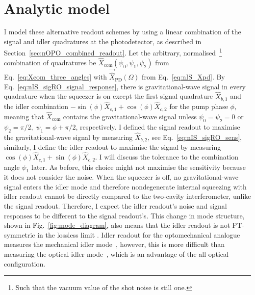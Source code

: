 \section{Analytic model}
\label{sec:nIS_idlerRO_model}

I model these alternative readout schemes by using a linear combination of the signal and idler quadratures at the photodetector, as described in Section~\ref{sec:nOPO_combined_readout}. Let the arbitrary, normalised~\footnote{Such that the vacuum value of the shot noise is still one.} combination of quadratures be $\hat{X}_\text{com}(\psi_0,\psi_1,\psi_2)$ from Eq.~\ref{eq:Xcom_three_angles} with $\vec{\hat X}_\text{PD}(\Omega)$ from Eq.~\ref{eq:nIS_Xpd}. By Eq.~\ref{eq:nIS_sigRO_signal_response}, there is gravitational-wave signal in every quadrature when the squeezer is on except the first signal quadrature $\hat{X}_{b,1}$ and the idler combination $-\sin(\phi)\hat{X}_{c,1}+\cos(\phi)\hat{X}_{c,2}$ for the pump phase $\phi$, meaning that $\hat{X}_\text{com}$ contains the gravitational-wave signal unless $\psi_0=\psi_2=0$ or $\psi_2=\pi/2,\;\psi_1=\phi+\pi/2$, respectively. I defined the signal readout to maximise the gravitational-wave signal by measuring $\hat{X}_{b,2}$, see Eq.~\ref{eq:nIS_sigRO_sens}, similarly, I define the idler readout to maximise the signal by measuring $\cos(\phi)\hat{X}_{c,1}+\sin(\phi)\hat{X}_{c,2}$. I will discuss the tolerance to the combination angle $\psi_1$ later. As before, this choice might not maximise the sensitivity because it does not consider the noise.
When the squeezer is off, no gravitational-wave signal enters the idler mode and therefore nondegenerate internal squeezing with idler readout cannot be directly compared to the two-cavity interferometer, unlike the signal readout. Therefore, I expect the idler readout's noise and signal responses to be different to the signal readout's.
This change in mode structure, shown in Fig.~\ref{fig:mode_diagram}, also means that the idler readout is not PT-symmetric in the lossless limit . Idler readout for the optomechanical analogue measures the mechanical idler mode~\cite{Li2021}, however, this is more difficult than measuring the optical idler mode~\cite{}, which is an advantage of the all-optical configuration.

